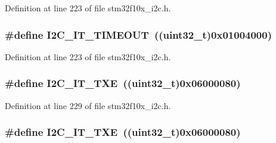 Definition at line 223 of file stm32f10x\+\_\+i2c.\+h.

\subsubsection[{\texorpdfstring{I2\+C\+\_\+\+I\+T\+\_\+\+T\+I\+M\+E\+O\+UT}{I2C_IT_TIMEOUT}}]{\setlength{\rightskip}{0pt plus 5cm}\#define I2\+C\+\_\+\+I\+T\+\_\+\+T\+I\+M\+E\+O\+UT~(({\bf uint32\+\_\+t})0x01004000)}\hypertarget{group___i2_c__interrupts__definition_ga45ce34b163b456a5fb3833f1264d93b4}{}\label{group___i2_c__interrupts__definition_ga45ce34b163b456a5fb3833f1264d93b4}


Definition at line 223 of file stm32f10x\+\_\+i2c.\+h.

\subsubsection[{\texorpdfstring{I2\+C\+\_\+\+I\+T\+\_\+\+T\+XE}{I2C_IT_TXE}}]{\setlength{\rightskip}{0pt plus 5cm}\#define I2\+C\+\_\+\+I\+T\+\_\+\+T\+XE~(({\bf uint32\+\_\+t})0x06000080)}\hypertarget{group___i2_c__interrupts__definition_gacb41229da2cd9460c3272cfb13aa29d3}{}\label{group___i2_c__interrupts__definition_gacb41229da2cd9460c3272cfb13aa29d3}


Definition at line 229 of file stm32f10x\+\_\+i2c.\+h.

\subsubsection[{\texorpdfstring{I2\+C\+\_\+\+I\+T\+\_\+\+T\+XE}{I2C_IT_TXE}}]{\setlength{\rightskip}{0pt plus 5cm}\#define I2\+C\+\_\+\+I\+T\+\_\+\+T\+XE~(({\bf uint32\+\_\+t})0x06000080)}\hypertarget{group___i2_c__interrupts__definition_gacb41229da2cd9460c3272cfb13aa29d3}{}\label{group___i2_c__interrupts__definition_gacb41229da2cd9460c3272cfb13aa29d3}


